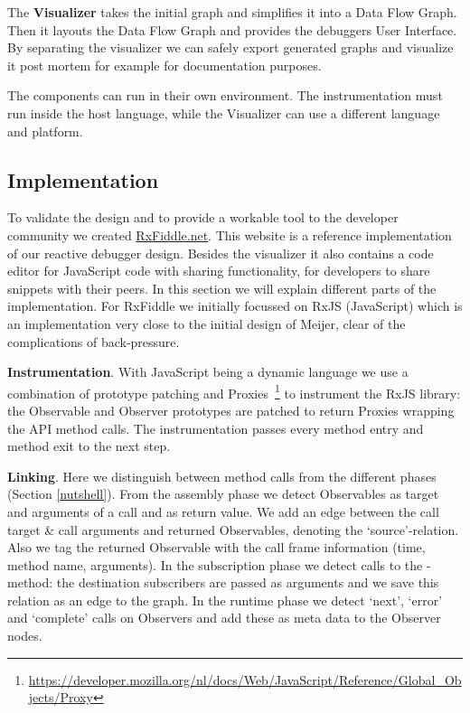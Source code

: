 The \textbf{Visualizer} takes the initial graph and simplifies it into a Data Flow Graph. Then it layouts the Data Flow Graph and provides the debuggers User Interface. By separating the visualizer we can safely export generated graphs and visualize it post mortem for example for documentation purposes.

The components can run in their own environment. The instrumentation must run inside the host language, while the Visualizer can use a different language and platform.

\subsection{Implementation}
To validate the design and to provide a workable tool to the developer community we created \url{RxFiddle.net}. This website is a reference implementation of 
our reactive debugger design. Besides the visualizer it also contains a code editor for JavaScript code with sharing functionality, for developers to share snippets with their peers. In this section we will explain different parts of the implementation. For RxFiddle we initially focussed on RxJS (JavaScript) which is an implementation very close to the initial design of Meijer, clear of the complications of back-pressure.

\textbf{Instrumentation}. With JavaScript being a dynamic language we use a combination of prototype patching and Proxies~\footnote{\url{https://developer.mozilla.org/nl/docs/Web/JavaScript/Reference/Global_Objects/Proxy}} to instrument the RxJS library: the Observable and Observer prototypes are patched to return Proxies wrapping the API method calls. The instrumentation passes every method entry and method exit to the next step.

\textbf{Linking}. Here we distinguish between method calls from the different phases (Section \ref{nutshell}). From the assembly phase we detect Observables as target and arguments of a call and as return value. We add an edge between the call target \& call arguments and returned Observables, denoting the `source'-relation. Also we tag the returned Observable with the call frame information (time, method name, arguments). In the subscription phase we detect calls to the -method: the destination subscribers are passed as arguments and we save this relation as an edge to the graph. In the runtime phase we detect `next', `error' and `complete' calls on Observers and add these as meta data to the Observer nodes.

